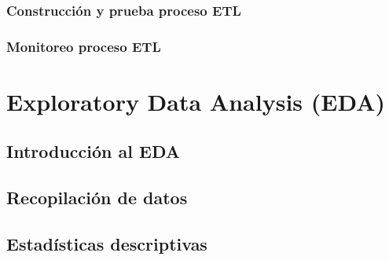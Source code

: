 \documentclass[letterpaper, 12pt]{report}
\begin{document}
\subsection{Construcción y prueba proceso ETL}


\subsection{Monitoreo proceso ETL}


\chapter{Exploratory Data Analysis (EDA)}

\section{Introducción al EDA}


\section{Recopilación de datos}


\section{Estadísticas descriptivas}


% 

%

%

%

\begin{doublespace}
  
  
\end{doublespace}
\end{document}
